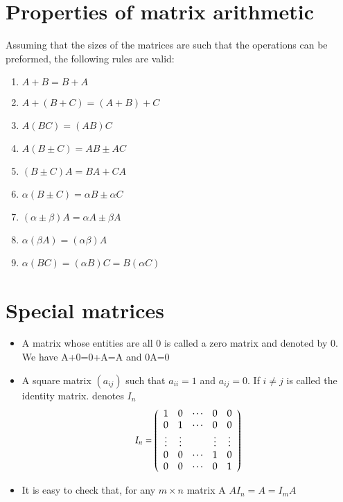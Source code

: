 \documentclass{article}[18pt]
\begin{document}
\section{Properties of matrix arithmetic}
Assuming that the sizes of the matrices are such that the operations can be preformed, the following rules are valid:
\begin{enumerate}
	\item $A+B=B+A$
	\item $A+(B+C)=(A+B)+C$
	\item $A(BC)=(AB)C$
	\item $A(B\pm C)=AB\pm AC$
	\item $(B\pm C)A=BA+CA$
	\item $\alpha(B\pm C)=\alpha B\pm \alpha C$
	\item $(\alpha \pm \beta)A=\alpha A\pm \beta A$
	\item $\alpha(\beta A)=(\alpha\beta)A$
	\item $\alpha(BC)=(\alpha B)C=B(\alpha C)$ 
\end{enumerate}
\section{Special matrices}
\begin{itemize}
	\item A matrix whose entities are all 0 is called a zero matrix and denoted by 0. \\
	We have A+0=0+A=A and 0A=0
	\item A square matrix $(a_{ij})$ such that $a_{ii}=1$ and $a_{ij}=0$. If $i\neq j$ is called the identity matrix. denotes $I_n$
	 $$I _ { n } = \left( \begin{array} { c c c c c } { 1 } & { 0 } & { \cdots } & { 0 } & { 0 } \\ { 0 } & { 1 } & { \cdots } & { 0 } & { 0 } \\ { \vdots } & { \vdots } & { } & { \vdots } & { \vdots } \\ { 0 } & { 0 } & { \cdots } & { 1 } & { 0 } \\ { 0 } & { 0 } & { \cdots } & { 0 } & { 1 } \end{array} \right)$$
	 \item It is easy to check that, for any $m\times n$ matrix A $AI_n=A=I_mA$
\end{itemize}
\end{document}
